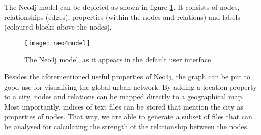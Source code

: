 The Neo4j model can be depicted as shown in figure \ref{fig:neo4j}. It consists of nodes, relationships (edges), properties (within the nodes and relations) and labels (coloured blocks above the nodes).

\begin{figure}[H]
\centering
\texttt{[image: neo4model]}
\caption{The Neo4j model, as it appears in the default user interface}
\label{fig:neo4j}
\end{figure}

Besides the aforementioned useful properties of Neo4j, the graph can be put to good use for visualising the global urban network. By adding a location property to a city, nodes and relations can be mapped directly to a geographical map. Most importantly, indices of text files can be stored that mention the city as properties of nodes. That way, we are able to generate a subset of files that can be analysed for calculating the strength of the relationship between the nodes.